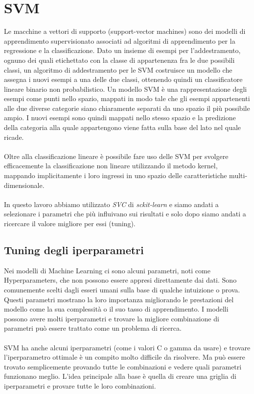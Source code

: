 \documentclass[../../Report.tex]{subfiles}
\begin{document}
\section{SVM}

    Le macchine a vettori di supporto (support-vector machines) sono dei modelli di apprendimento supervisionato associati ad algoritmi di apprendimento per la regressione e la classificazione. Dato un insieme di esempi per l'addestramento, ognuno dei quali etichettato con la classe di appartenenza fra le due possibili classi, un algoritmo di addestramento per le SVM costruisce un modello che assegna i nuovi esempi a una delle due classi, ottenendo quindi un classificatore lineare binario non probabilistico. Un modello SVM è una rappresentazione degli esempi come punti nello spazio, mappati in modo tale che gli esempi appartenenti alle due diverse categorie siano chiaramente separati da uno spazio il più possibile ampio. I nuovi esempi sono quindi mappati nello stesso spazio e la predizione della categoria alla quale appartengono viene fatta sulla base del lato nel quale ricade.\\
    \\
    Oltre alla classificazione lineare è possibile fare uso delle SVM per svolgere efficacemente la classificazione non lineare utilizzando il metodo kernel, mappando implicitamente i loro ingressi in uno spazio delle caratteristiche multi-dimensionale.\\
    \\
    In questo lavoro abbiamo utilizzato \emph{SVC} di \emph{sckit-learn} e siamo andati a selezionare i parametri che più influivano sui risultati e solo dopo siamo andati a ricercare il valore migliore per essi (tuning).
\subsection{Tuning degli iperparametri}
    Nei modelli di Machine Learning ci sono alcuni parametri, noti come Hyperparameters, che non possono essere appresi direttamente dai dati. Sono comunemente scelti dagli esseri umani sulla base di qualche intuizione o prova. Questi parametri mostrano la loro importanza migliorando le prestazioni del modello come la sua complessità o il suo tasso di apprendimento. I modelli possono avere molti iperparametri e trovare la migliore combinazione di parametri può essere trattato come un problema di ricerca.\\
    \\
    SVM ha anche alcuni iperparametri (come i valori C o gamma da usare) e trovare l'iperparametro ottimale è un compito molto difficile da risolvere. Ma può essere trovato semplicemente provando tutte le combinazioni e vedere quali parametri funzionano meglio. L'idea principale alla base è quella di creare una griglia di iperparametri e provare tutte le loro combinazioni.
\end{document}
